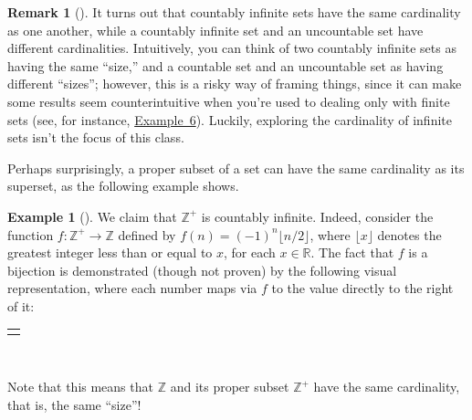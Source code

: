 \documentclass[10pt,]{book}
\theoremstyle{plain}
\theoremstyle{definition}
\theoremstyle{definition}
\newtheorem{remark}[theorem]{Remark}
\theoremstyle{definition}
\newtheorem{example}[theorem]{Example}
\theoremstyle{definition}
\numberwithin{equation}{section}
\newlength{\panelmax}
\def\Z{\mathbb{Z}}
\def\R{\mathbb{R}}
\begin{document}
\begin{remark}[]\label{remark-3}
It turns out that countably infinite sets have the same cardinality as one another, while a countably infinite set and an uncountable set have different cardinalities. Intuitively, you  can think  of two countably infinite sets as having the same ``size,'' and a countable set and an uncountable set as having different ``sizes''; however, this is a risky way of framing things, since it can  make some results seem counterintuitive when you're used to dealing only with finite sets (see, for instance, \hyperref[zplus]{Example~6}).  Luckily, exploring the cardinality of infinite sets isn't the focus of this class.%
\end{remark}
Perhaps surprisingly, a proper subset of a set can have the same cardinality as its superset, as the following example shows.%
\begin{example}[]\label{zplus}
We claim that \(\Z^+\) is countably infinite. Indeed, consider the function \(f:\Z^+ \to \Z\) defined by \(f(n)=(-1)^n \lfloor n/2 \rfloor\), where \(\lfloor x \rfloor\) denotes the greatest integer less than or equal to \(x\), for each \(x\in \R\). The fact that \(f\) is a bijection is demonstrated (though not proven) by the following visual representation, where each number maps via \(f\) to the value directly to the right of it: %
{%
\setlength{\panelmax}{0pt}
\newsavebox{\panelboxAtabular}
\newlength{\phAtabular}\setlength{\phAtabular}{\ht\panelboxAtabular+\dp\panelboxAtabular}
\settototalheight{\phAtabular}{\usebox{\panelboxAtabular}}
\setlength{\panelmax}{\maxof{\panelmax}{\phAtabular}}
\leavevmode%
\setlength{\tabcolsep}{0\textwidth}
\par\medskip\noindent
\begin{tabular}{@{}*{1}{c}@{}}
\begin{minipage}[c][\panelmax][t]{1\textwidth}\usebox{\panelboxAtabular}\end{minipage}\end{tabular}\\
}%
%
\par
Note that this means that \(\Z\) and its proper subset \(\Z^+\) have the same cardinality, that is, the same ``size''!%
\end{example}
\end{document}
